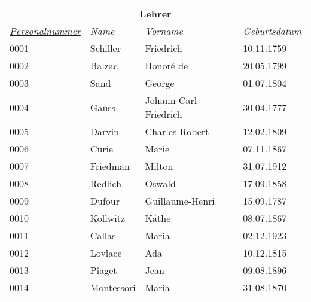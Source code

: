 \documentclass{standalone}
\begin{document}
\begin{tabular}{|l|l|l|l|}
    \hline
    \multicolumn{4}{|c|}{\cellcolor[HTML]{C0C0C0} \textbf{Lehrer}} \\
    \textit{\underline{Personalnummer}}&
    \textit{Name}&
    \textit{Vorname}&
    \textit{Geburtsdatum} \\ \hline
    0001&Schiller&Friedrich&10.11.1759\\
    0002&Balzac&Honoré de&20.05.1799\\
    0003&Sand&George&01.07.1804\\
    0004&Gauss&Johann Carl Friedrich&30.04.1777\\
    0005&Darvin&Charles Robert&12.02.1809\\
    0006&Curie&Marie&07.11.1867\\
    0007&Friedman&Milton&31.07.1912\\
    0008&Redlich&Oswald&17.09.1858\\
    0009&Dufour&Guillaume-Henri&15.09.1787\\
    0010&Kollwitz&Käthe&08.07.1867\\
    0011&Callas&Maria&02.12.1923\\
    0012&Lovlace&Ada&10.12.1815\\
    0013&Piaget&Jean&09.08.1896\\
    0014&Montessori&Maria&31.08.1870\\
    \hline
    \end{tabular}
\end{document}
